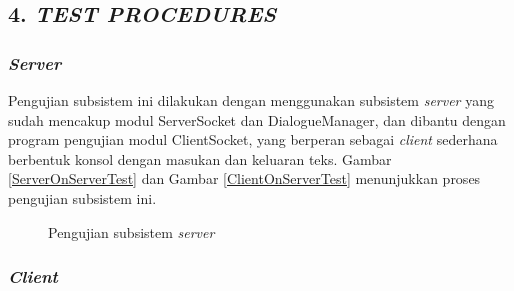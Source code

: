 \subsection*{\textcolor{subsectioncolor}{\textsf{4. \textit{TEST PROCEDURES}}}}


\subsubsection*{\textit{Server}}

Pengujian subsistem ini dilakukan dengan menggunakan subsistem \textit{server} yang sudah mencakup modul ServerSocket dan DialogueManager,
dan dibantu dengan program pengujian modul ClientSocket,
yang berperan sebagai \textit{client} sederhana berbentuk konsol dengan masukan dan keluaran teks.
Gambar \ref{ServerOnServerTest} dan Gambar \ref{ClientOnServerTest} menunjukkan proses pengujian subsistem ini.

\begin{figure}
\centering
{}
\caption{Pengujian subsistem \textit{server}}
\label{ServerTest}
\end{figure}


\subsubsection*{\textit{Client}}

